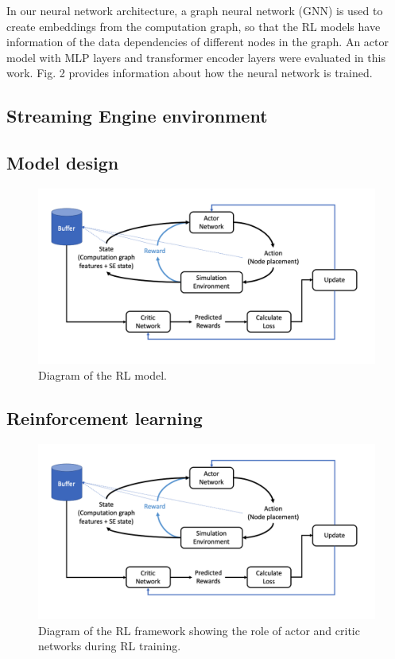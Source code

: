 In our neural network architecture, a graph neural network (GNN) is used to create embeddings from the computation graph, so that the RL models have information of the data dependencies of different nodes in the graph. 
An actor model with MLP layers and transformer encoder layers were evaluated in this work. Fig. 2 provides information about how the neural network is trained. 

\subsection{Streaming Engine environment}


\subsection{Model design}


\begin{figure}[h]
  \centering
  \includegraphics[width=\linewidth]{fig/ppo.png}
  \caption{Diagram of the RL model. }
\end{figure}




\subsection{Reinforcement learning}


\cite{corr/SchulmanWDRK17}

\begin{figure}[h]
  \centering
  \includegraphics[width=\linewidth]{fig/ppo.png}
  \caption{Diagram of the RL framework showing the role of actor and critic networks during RL training. }
\end{figure}
